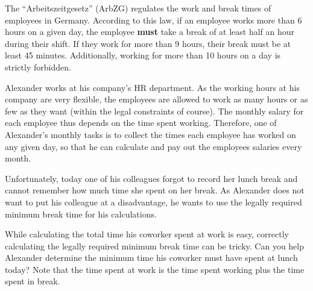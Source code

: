 



%
%
The ``Arbeitszeitgesetz'' (ArbZG) regulates the work and break times of employees in Germany. According to this law, if an employee works more than 6 hours on a given day, the employee \textbf{must} take a break of at least half an hour during their shift. If they work for more than 9 hours, their break must be at least 45 minutes. Additionally, working for more than 10 hours on a day is strictly forbidden.

Alexander works at his company's HR department. As the working hours at his company are very flexible, the employees are allowed to work as many hours or as few as they want (within the legal constraints of course). The monthly salary for each employee thus depends on the time spent working. Therefore, one of Alexander's monthly tasks is to collect the times each employee has worked on any given day, so that he can calculate and pay out the employees salaries every month.

Unfortunately, today one of his colleagues forgot to record her lunch break and cannot remember how much time she spent on her break. As Alexander does not want to put his colleague at a disadvantage, he wants to use the legally required minimum break time for his calculations.

While calculating the total time his coworker spent at work is easy, correctly calculating the legally required minimum break time can be tricky. Can you help Alexander determine the minimum time his coworker must have spent at lunch today?
Note that the time spent at work is the time spent working plus the time spent in break.

